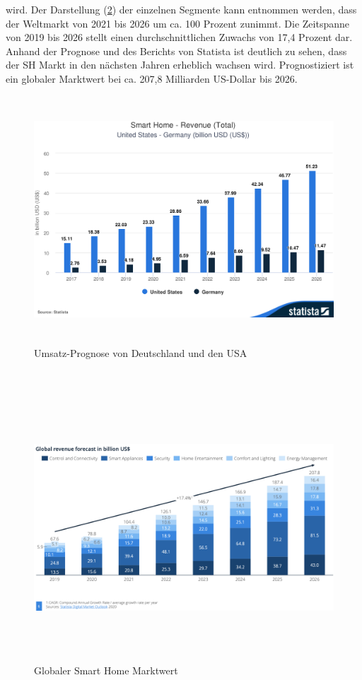         wird. Der Darstellung (\ref{pic:globalmarket}) der einzelnen Segmente kann entnommen werden, dass der Weltmarkt von 
        2021 bis 2026 um ca. 100 Prozent zunimmt. Die Zeitspanne von 2019 bis 2026 stellt einen durchschnittlichen Zuwachs von 
        17,4 Prozent dar. Anhand der Prognose und des Berichts von Statista ist deutlich zu sehen, dass der \acl{SH} Markt in 
        den nächsten Jahren erheblich wachsen wird. Prognostiziert ist ein globaler Marktwert bei ca. 207,8 Milliarden 
        US-Dollar bis 2026.
        \begin{figure}[hbt!]
            \centering
            \includegraphics[width=15cm,height=9.25cm,keepaspectratio]{images/Statista-Outlook-Smart-Home---Revenue-Total-United-States---Germany-billion-USD-US.png}
            \caption{Umsatz-Prognose von Deutschland und den USA \cite{statista2021}} 
            \label{pic:revenue}
        \end{figure}
        \\
        \begin{figure}[hbt!]
            \centering
            \includegraphics[width=15cm,height=10cm,keepaspectratio]{images/global_Worth_smart-home.png}
            \caption{Globaler Smart Home Marktwert \cite{statista2021}} 
            \label{pic:globalmarket}
        \end{figure}
        \pagebreak 
